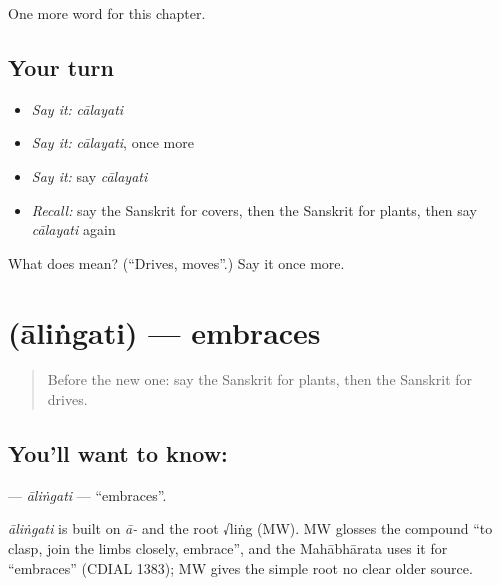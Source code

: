 \begin{grammarlens}[title={What you've built}]
One more word for this chapter.
\end{grammarlens}

\subsection*{Your turn}
\begin{itemize}
\raggedright
  \item \emph{Say it:} \emph{cālayati}
  \item \emph{Say it:} \emph{cālayati}, once more
  \item \emph{Say it:} say \emph{cālayati}
  \item \emph{Recall:} say the Sanskrit for covers, then the Sanskrit for plants, then say \emph{cālayati} again
\end{itemize}

\begin{tcolorbox}[breakable,colback=teal!4,colframe=teal!35!black,title={Before you move on}]
What does  mean? (\textquotedblleft{}Drives, moves\textquotedblright{}.) Say it once more.
\end{tcolorbox}
\section[\texorpdfstring{\sk{आलिंगति} (āliṅgati)}{आलिंगति (āliṅgati)}]{ (āliṅgati) — embraces}

\label{lesson:SA-C235-alingati}



\begin{quote}
Before the new one: say the Sanskrit for plants, then the Sanskrit for drives.
\end{quote}

\subsection*{You'll want to know: }
\textbf{} — \emph{āliṅgati} — \textquotedblleft{}embraces\textquotedblright{}.

\begin{cousinweb}
\emph{āliṅgati} is built on \emph{ā-} and the root √liṅg (MW). MW glosses the compound \textquotedblleft{}to clasp, join the limbs closely, embrace\textquotedblright{}, and the Mahābhārata uses it for \textquotedblleft{}embraces\textquotedblright{} (CDIAL 1383); MW gives the simple root no clear older source.
\end{cousinweb}

